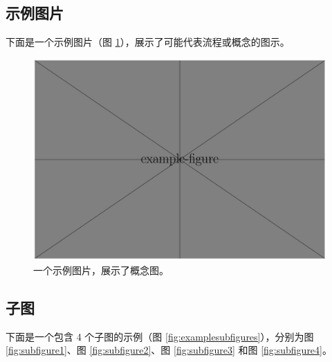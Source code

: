 \documentclass[a4paper,UTF8]{ctexart}
\begin{document}
\subsection{示例图片}

下面是一个示例图片（图 \ref{fig:examplefig}），展示了可能代表流程或概念的图示。

\begin{figure}[htbp]
    \centering
    \includegraphics[width=0.8\linewidth]{example-figure}
    \caption{
        一个示例图片，展示了概念图。
    }
    \label{fig:examplefig}
\end{figure}

\subsection{子图}

下面是一个包含 4 个子图的示例（图 \ref{fig:examplesubfigures}），分别为图 \ref{fig:subfigure1}、图 \ref{fig:subfigure2}、图 \ref{fig:subfigure3} 和图 \ref{fig:subfigure4}。
\end{document}
